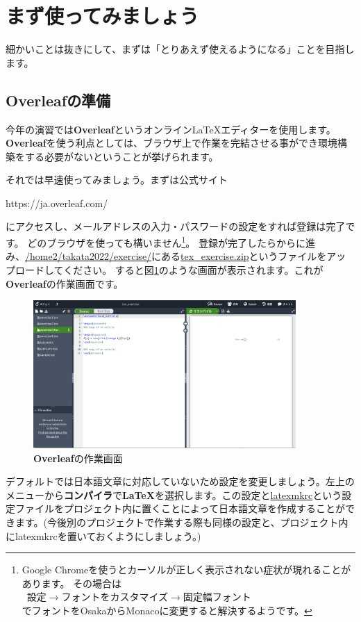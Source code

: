 
\section{まず使ってみましょう}\label{sec:triaez}
細かいことは抜きにして、まずは「とりあえず使えるようになる」ことを目指し
ます。
\subsection{\textbf{Overleaf}の準備}\label{sec:overleaf}
今年の演習では\textbf{Overleaf}というオンライン{\LaTeX}エディターを使用します。
\textbf{Overleaf}を使う利点としては、ブラウザ上で作業を完結させる事ができ環境構築をする必要がないということが挙げられます。

それでは早速使ってみましょう。まずは公式サイト
 \begin{screen}
    https://ja.overleaf.com/
 \end{screen}
にアクセスし、メールアドレスの入力・パスワードの設定をすれば登録は完了です。
どのブラウザを使っても構いません\footnote{Google Chromeを使うとカーソルが正しく表示されない症状が現れることがあります。
その場合は\\ \ 設定$\rightarrow$フォントをカスタマイズ$\rightarrow$固定幅フォント\\ でフォントをOsakaからMonacoに変更すると解決するようです。}。
登録が完了したらからに進み、\underline{/home2/takata2022/exercise/}にある\underline{tex\_exercise.zip}というファイルをアップロードしてください。
すると図\ref{overleaf}のような画面が表示されます。これが\textbf{Overleaf}の作業画面です。
\begin{figure}[htbp]
  \centering
  \includegraphics[width=100mm]{overleaf_start.png}
  \caption{\textbf{Overleaf}の作業画面}
  \label{overleaf}
\end{figure}
デフォルトでは日本語文章に対応していないため設定を変更しましょう。左上のメニューから\textbf{コンパイラ}で\textbf{LaTeX}を選択します。この設定と\underline{latexmkrc}という設定ファイルをプロジェクト内に置くことによって日本語文章を作成することができます。(今後別のプロジェクトで作業する際も同様の設定と、プロジェクト内にlatexmkrcを置いておくようにしましょう。)

